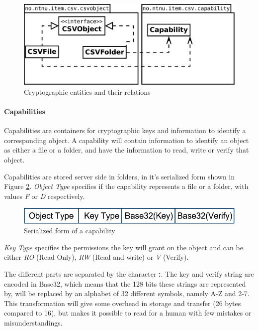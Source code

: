 \documentclass[pdftex,english,10pt,b5paper,twoside]{book}
\begin{document}
\begin{figure}[h!]
    \centering
    \includegraphics[scale=0.4]{csvobjects.pdf}
    \caption{Cryptographic entities and their relations}
    \label{fig:CSVlib:overview}
\end{figure}

\paragraph{Capabilities} Capabilities are containers for
cryptographic keys and information to identify a corresponding object. A
capability will contain information to identify an object as either a file or a
folder, and have the information to read, write or verify that object.

Capabilities are stored server side in folders, in it's serialized form shown
in Figure \ref{fig:CAP:serial}. \emph{Object Type} specifies if the capability
represents a file or a folder, with values \emph{F} or \emph{D}
respectively.

\begin{figure}[h!]
    \centering
    \includegraphics[scale=0.6]{CapabilitySerialization.pdf}
    \caption{Serialized form of a capability}
    \label{fig:CAP:serial}
\end{figure}

\emph{Key Type} specifies the permissions the key will grant on the object and
can be either \emph{RO} (Read Only), \emph{RW} (Read and write) or \emph{V}
(Verify).

The different parts are separated by the character \textbf{:}. The key and
verify string are encoded in Base32, which means that the 128 bits these
strings are represented by, will be replaced by an alphabet of 32 different
symbols, namely A-Z and 2-7. This transformation will give some overhead in
storage and transfer (26 bytes compared to 16), but makes it possible to read for a human
with few mistakes or misunderstandings.
\end{document}
